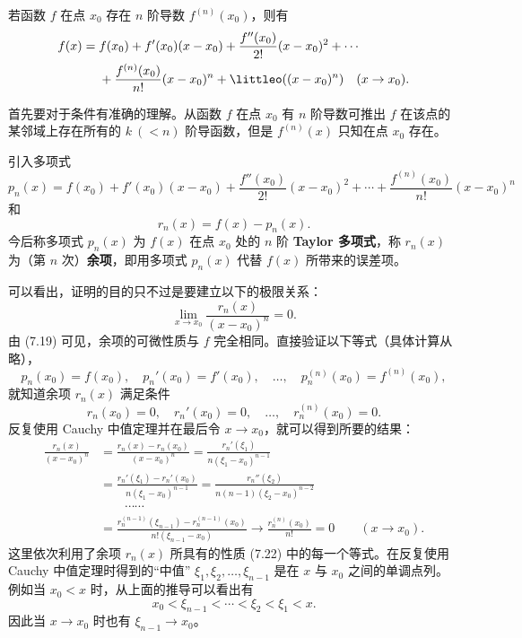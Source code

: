 \begin{xproposition}
若函数 $f$ 在点 $x_0$ 存在 $n$ 阶导数 $f^{(n)}(x_0)$，则有
\[
  \begin{aligned}
  f(x)={}&f(x_0)+f'(x_0)(x-x_0)+\frac{f''(x_0)}{2!}(x-x_0)^2+\cdots\\
  &+\frac{f^{(n)}(x_0)}{n!}(x-x_0)^n+\littleo((x-x_0)^n)\quad(x\to x_0).
  \end{aligned}
\]
\end{xproposition}
\begin{xproof}
首先要对于条件有准确的理解。从函数 $f$ 在点 $x_0$ 有 $n$ 阶导数可推出 $f$ 在该点的某邻域上存在所有的 $k\ (<n)$ 阶导函数，但是 $f^{(n)}(x)$ 只知在点 $x_0$ 存在。

引入多项式
\begin{equation}
  p_n(x)=f(x_0)+f'(x_0)(x-x_0)+\frac{f''(x_0)}{2!}(x-x_0)^2+\cdots+\frac{f^{(n)}(x_0)}{n!}(x-x_0)^n
  \tag{7.18}
\end{equation}
和
\begin{equation}
  r_n(x)=f(x)-p_n(x).
  \tag{7.19}
\end{equation}
今后称多项式 $p_n(x)$ 为 $f(x)$ 在点 $x_0$ 处的 $n$ 阶 \textbf{Taylor 多项式}，称 $r_n(x)$ 为（第 $n$ 次）\textbf{余项}，即用多项式 $p_n(x)$ 代替 $f(x)$ 所带来的误差项。

可以看出，证明的目的只不过是要建立以下的极限关系：
\begin{equation}
  \lim_{x\to x_0}\frac{r_n(x)}{(x-x_0)^n}=0.
  \tag{7.20}
\end{equation}
由 (7.19) 可见，余项的可微性质与 $f$ 完全相同。直接验证以下等式（具体计算从略），
\begin{equation}
  p_n(x_0)=f(x_0),\quad p_n'(x_0)=f'(x_0),\quad\ldots,\quad p_n^{(n)}(x_0)=f^{(n)}(x_0),
  \tag{7.21}
\end{equation}
就知道余项 $r_n(x)$ 满足条件
\begin{equation}
  r_n(x_0)=0,\quad r_n'(x_0)=0,\quad\ldots,\quad r_n^{(n)}(x_0)=0.
  \tag{7.22}
\end{equation}
反复使用 Cauchy 中值定理并在最后令 $x\to x_0$，就可以得到所要的结果：
\[
  \begin{aligned}
  \frac{r_n(x)}{(x-x_0)^n}
  &=\frac{r_n(x)-r_n(x_0)}{(x-x_0)^n}
   =\frac{r_n'(\xi_1)}{n(\xi_1-x_0)^{n-1}}\\
  &=\frac{r_n'(\xi_1)-r_n'(x_0)}{n(\xi_1-x_0)^{n-1}}
   =\frac{r_n''(\xi_2)}{n(n-1)(\xi_2-x_0)^{n-2}}\\
  &\qquad\cdots\cdots\\
  &=\frac{r_n^{(n-1)}(\xi_{n-1})-r_n^{(n-1)}(x_0)}{n!(\xi_{n-1}-x_0)}
  \longrightarrow\frac{r_n^{(n)}(x_0)}{n!}=0\qquad(x\to x_0).
  \end{aligned}
\]
这里依次利用了余项 $r_n(x)$ 所具有的性质 (7.22) 中的每一个等式。在反复使用 Cauchy 中值定理时得到的“中值” $\xi_1,\xi_2,\ldots,\xi_{n-1}$ 是在 $x$ 与 $x_0$ 之间的单调点列。例如当 $x_0<x$ 时，从上面的推导可以看出有
\[
  x_0<\xi_{n-1}<\cdots<\xi_2<\xi_1<x.
\]
因此当 $x\to x_0$ 时也有 $\xi_{n-1}\to x_0$。


\end{xproof}
